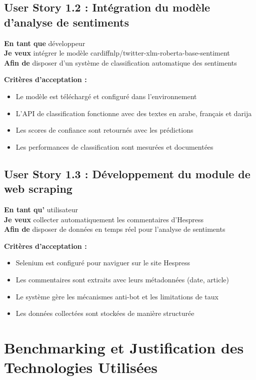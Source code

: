 \subsection{User Story 1.2 : Intégration du modèle d'analyse de sentiments}

\textbf{En tant que} développeur \\
\textbf{Je veux} intégrer le modèle cardiffnlp/twitter-xlm-roberta-base-sentiment \\
\textbf{Afin de} disposer d'un système de classification automatique des sentiments

\textbf{Critères d'acceptation :}
\begin{itemize}
    \item Le modèle est téléchargé et configuré dans l'environnement
    \item L'API de classification fonctionne avec des textes en arabe, français et darija
    \item Les scores de confiance sont retournés avec les prédictions
    \item Les performances de classification sont mesurées et documentées
\end{itemize}

\subsection{User Story 1.3 : Développement du module de web scraping}

\textbf{En tant qu'} utilisateur \\
\textbf{Je veux} collecter automatiquement les commentaires d'Hespress \\
\textbf{Afin de} disposer de données en temps réel pour l'analyse de sentiments

\textbf{Critères d'acceptation :}
\begin{itemize}
    \item Selenium est configuré pour naviguer sur le site Hespress
    \item Les commentaires sont extraits avec leurs métadonnées (date, article)
    \item Le système gère les mécanismes anti-bot et les limitations de taux
    \item Les données collectées sont stockées de manière structurée
\end{itemize}

\section{Benchmarking et Justification des Technologies Utilisées}

